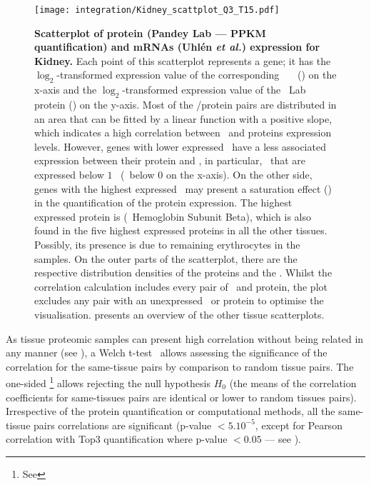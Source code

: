 \begin{figure}[!htbp]
    \texttt{[image: integration/Kidney\_scattplot\_Q3\_T15.pdf]}\centering
    \caption[Scatterplot of protein (Pandey Lab data --- PPKM quantification)
    and mRNA (Uhlén \etal) expression for Kidney]
    {\label{fig:ScatKid}\textbf{Scatterplot of
    protein (Pandey Lab --- PPKM quantification) and mRNAs (Uhlén \textit{et al.})
    expression for Kidney.}
    Each point of this scatterplot represents a gene;
    it has the $\log_2$-transformed expression value
    of the corresponding \uhlen\ \etal\ \mRNA\ (\FPKM) on the x-axis and
    the $\log_2$-transformed expression value of
    the \pandey\ Lab protein (\PPKM) on the y-axis.
    Most of the \mRNA/protein pairs are distributed in an area
    that can be fitted by a linear function with a positive slope,
    which indicates a high correlation between \mRNAs\ and proteins expression
    levels.
    However, genes with lower expressed \mRNAs\ have
    a less associated expression between their protein and \mRNA,
    in particular, \mRNAs\ that are expressed
    below $1$ \FPKM\ (\ie\ below $0$ on the x-axis).
    On the other side, genes with the highest expressed \mRNAs\ may present
    a saturation effect ()
    in the quantification of the protein expression.
    The highest expressed protein is 
    (\ie\ Hemoglobin Subunit Beta), which is also found in
    the five highest expressed proteins in all the other tissues.
    Possibly, its presence is due to remaining erythrocytes in the samples.
    On the outer parts of the scatterplot,
    there are the respective distribution densities of the proteins and the \mRNAs.
    Whilst the correlation calculation includes every pair of \mRNA\ and protein,
    the plot excludes any pair with an unexpressed \mRNA\ or protein to optimise the visualisation.
     presents an overview of the other tissue scatterplots.
    }
\end{figure}

As tissue proteomic samples can present high correlation
without being related in any manner
(see ),
a Welch t-test~ allows
assessing the significance of the correlation for the same-tissue pairs
by comparison to random tissue pairs.
The one-sided \Welchttest\footnote{See }
allows rejecting the null hypothesis $H_0$
(the means of the correlation coefficients for same-tissues pairs
are identical or lower to random tissues pairs).
Irrespective of the protein quantification or computational methods,
all the same-tissue pairs correlations are significant
(p-value $<5.10^{-5}$, except for Pearson correlation with Top3 quantification
where p-value $<0.05$ --- see ).\mybr\

